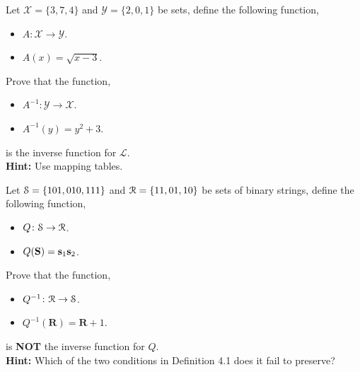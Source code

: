 \documentclass[12pt]{article} %
\begin{document}
\begin{qstn}[3][(7 marks)]
Let $ \mathcal{X} = \{3,7,4\} $ and $ \mathcal{Y} = \{2,0,1\} $ be sets, define the following function, 
\begin{itemize}
    \item $A \colon \mathcal{X} \to \mathcal{Y}$.
    \item $A(x) = \sqrt{x - 3}$.
\end{itemize}
Prove that the function,
\begin{itemize}
    \item $A^{-1} \colon \mathcal{Y} \to \mathcal{X}$.
    \item $A^{-1}(y) = y^2 + 3$.
\end{itemize}
is the inverse function for $\mathcal{L}$. \\
\textbf{Hint:} Use mapping tables.
  
\end{qstn}

\begin{qstn}[4][(3 marks)]
Let $\EuScript{S} = \{101,010,111\}$  and $\EuScript{R} = \{11,01,10\}$ be sets of binary strings, define the following function,
\begin{itemize}
    \item $Q \colon \EuScript{S} \to \EuScript{R}$.
    \item $Q(\textbf{S}) = \vb s_1 \vb s_2$.
\end{itemize}
Prove that the function,
\begin{itemize}
    \item $Q^{-1} \colon \EuScript{R} \to \EuScript{S}$.
    \item $Q^{-1}(\textbf{R}) = \textbf{R} + 1$.
\end{itemize}
is \textbf{NOT }the inverse function for $Q$.\\
\textbf{Hint:} Which of the two conditions in Definition 4.1 does it fail to preserve?

  
\end{qstn}
\end{document}
